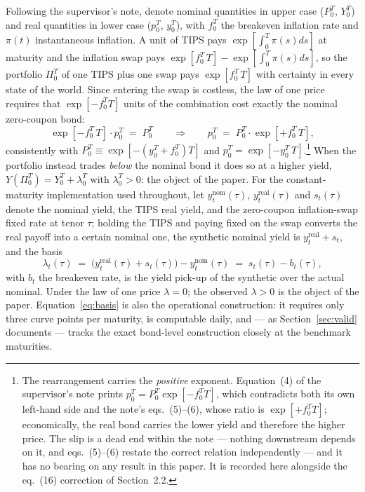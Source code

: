 \documentclass[11pt]{article}
\begin{document}
Following the supervisor's note, denote nominal quantities in upper case ($P_0^T$, $Y_0^T$) and real quantities in lower case ($p_0^T$, $y_0^T$), with $f_0^T$ the breakeven inflation rate and $\pi(t)$ instantaneous inflation. A unit of TIPS pays $\exp[\int_0^T\pi(s)ds]$ at maturity and the inflation swap pays $\exp[f_0^T\,T]-\exp[\int_0^T\pi(s)ds]$, so the portfolio $\Pi_0^T$ of one TIPS plus one swap pays $\exp[f_0^T\,T]$ with certainty in every state of the world. Since entering the swap is costless, the law of one price requires that $\exp[-f_0^T T]$ units of the combination cost exactly the nominal zero-coupon bond:
\begin{equation}
\exp\!\left[-f_0^T\,T\right]\cdot p_0^T \;=\; P_0^T
\qquad\Longrightarrow\qquad
p_0^T \;=\; P_0^T\cdot\exp\!\left[+f_0^T\,T\right],
\label{eq:loop}
\end{equation}
consistently with $P_0^T\equiv\exp[-(y_0^T+f_0^T)T]$ and $p_0^T=\exp[-y_0^T\,T]$.\footnote{The rearrangement carries the \emph{positive} exponent. Equation~(4) of the supervisor's note prints $p_0^T=P_0^T\exp[-f_0^T T]$, which contradicts both its own left-hand side and the note's eqs.~(5)--(6), whose ratio is $\exp[+f_0^T T]$; economically, the real bond carries the lower yield and therefore the higher price. The slip is a dead end within the note --- nothing downstream depends on it, and eqs.~(5)--(6) restate the correct relation independently --- and it has no bearing on any result in this paper. It is recorded here alongside the eq.~(16) correction of Section~2.2.} When the portfolio instead trades \emph{below} the nominal bond it does so at a higher yield, $Y(\Pi_0^T)=Y_0^T+\lambda_0^T$ with $\lambda_0^T>0$: the object of the paper. For the constant-maturity implementation used throughout, let $y^{\text{nom}}_t(\tau)$, $y^{\text{real}}_t(\tau)$ and $s_t(\tau)$ denote the nominal yield, the TIPS real yield, and the zero-coupon inflation-swap fixed rate at tenor $\tau$; holding the TIPS and paying fixed on the swap converts the real payoff into a certain nominal one, the synthetic nominal yield is $y^{\text{real}}_t+s_t$, and the basis
\begin{equation}
\lambda_t(\tau) \;=\; \big(y^{\text{real}}_t(\tau)+s_t(\tau)\big)-y^{\text{nom}}_t(\tau) \;=\; s_t(\tau)-b_t(\tau),
\label{eq:basis}
\end{equation}
with $b_t$ the breakeven rate, is the yield pick-up of the synthetic over the actual nominal. Under the law of one price $\lambda=0$; the observed $\lambda>0$ is the object of the paper. Equation~\eqref{eq:basis} is also the operational construction: it requires only three curve points per maturity, is computable daily, and --- as Section~\ref{sec:valid} documents --- tracks the exact bond-level construction closely at the benchmark maturities.
\end{document}
